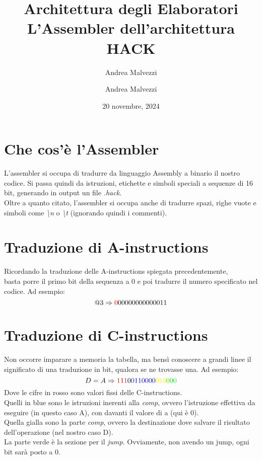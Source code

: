 \documentclass[12pt]{article}
\author{Andrea Malvezzi}
\title{\textbf{Architettura degli Elaboratori\\ L'Assembler dell'architettura HACK}}
\date{20 novembre, 2024}
\author{Andrea Malvezzi}
\begin{document}
\maketitle
\pagebreak
\tableofcontents
\pagebreak

\section{Che cos'è l'Assembler}
\label{sec:whats_assembler}
L'assembler si occupa di tradurre da linguaggio Assembly a binario il nostro codice. Si passa quindi da istruzioni, etichette e simboli speciali a sequenze di 16 bit, generando in output un file \textit{.hack}.
\\
Oltre a quanto citato, l'assembler si occupa anche di tradurre spazi, righe vuote e simboli come \textit{\textbackslash{n}} o \textit{\textbackslash{t}} (ignorando quindi i commenti).

\section{Traduzione di A-instructions}
\label{sec:a_instructions_translation_details}
Ricordando la traduzione delle A-instructions spiegata precedentemente,
\\
basta porre il primo bit della sequenza a 0 e poi tradurre il numero specificato nel codice. Ad esempio:
\[ @3 \Rightarrow \textcolor{red}{0}00000000000011 \]

\section{Traduzione di C-instructions}
\label{sec:c_instructions_translation_details}
Non occorre imparare a memoria la tabella, ma bensì conoscere a grandi linee il significato di una traduzione in bit, qualora se ne trovasse una. Ad esempio:
\[ D=A \Rightarrow \textcolor{red}{111}0\textcolor{blue}{0110000}\textcolor{yellow}{010}\textcolor{green}{000} \]
Dove le cifre in rosso sono valori fissi delle C-instructions.
\\
Quelli in blue sono le istruzioni inerenti alla \textit{comp}, ovvero l'istruzione effettiva da eseguire (in questo caso A), con davanti il valore di a (qui è 0).
\\
Quella gialla sono la parte \textit{comp}, ovvero la destinazione dove salvare il risultato dell'operazione (nel nostro caso D).
\\
La parte verde è la sezione per il \textit{jump}. Ovviamente, non avendo un jump, ogni bit sarà posto a 0.
\end{document}
